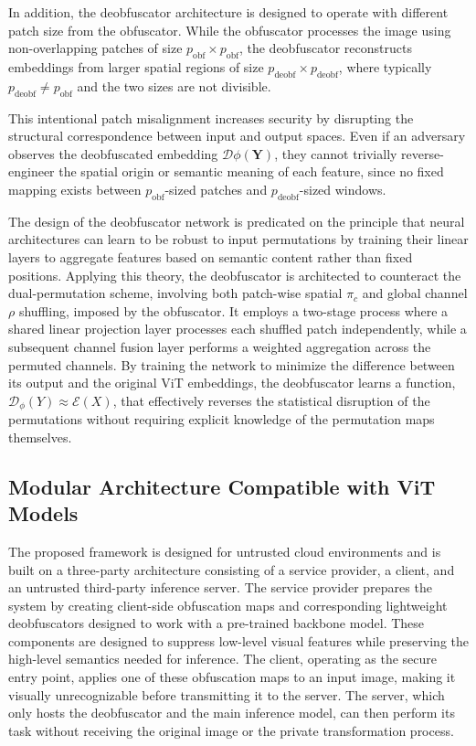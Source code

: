 \documentclass{ieeeaccess}
\newcommand{\rev}[1]{{\color{black}#1}}
\begin{document}
In addition, the deobfuscator architecture is designed to operate with different patch size from the obfuscator. While the obfuscator processes the image using non-overlapping patches of size $p_{\text{obf}} \times p_{\text{obf}}$, the deobfuscator reconstructs embeddings from larger spatial regions of size $p_{\text{deobf}} \times p_{\text{deobf}}$, where typically $p_{\text{deobf}} \neq p_{\text{obf}}$ and the two sizes are not divisible.

This intentional patch misalignment increases security by disrupting the structural correspondence between input and output spaces. Even if an adversary observes the deobfuscated embedding $\mathcal{D}\phi(\mathbf{Y})$, they cannot trivially reverse-engineer the spatial origin or semantic meaning of each feature, since no fixed mapping exists between $p_{\text{obf}}$-sized patches and $p_{\text{deobf}}$-sized windows.

{The design of the deobfuscator network is predicated on the principle that neural architectures can learn to be robust to input permutations by training their linear layers to aggregate features based on semantic content rather than fixed positions. Applying this theory, the deobfuscator is architected to counteract the dual-permutation scheme, involving both patch-wise spatial $\pi_c$ and global channel $\rho$ shuffling, imposed by the obfuscator. It employs a two-stage process where a shared linear projection layer processes each shuffled patch independently, while a subsequent channel fusion layer performs a weighted aggregation across the permuted channels. By training the network to minimize the difference between its output and the original ViT embeddings, the deobfuscator learns a function, $\mathcal{D}_{\phi}(Y) \approx \mathcal{E}(X)$, that effectively reverses the statistical disruption of the permutations without requiring explicit knowledge of the permutation maps themselves.}


\subsection{Modular Architecture Compatible with ViT Models}\label{sec:pro:modular}

\rev{The proposed framework is designed for untrusted cloud environments and is built on a three-party architecture consisting of a service provider, a client, and an untrusted third-party inference server. The service provider prepares the system by creating client-side obfuscation maps and corresponding lightweight deobfuscators designed to work with a pre-trained backbone model. These components are designed to suppress low-level visual features while preserving the high-level semantics needed for inference. The client, operating as the secure entry point, applies one of these obfuscation maps to an input image, making it visually unrecognizable before transmitting it to the server. The server, which only hosts the deobfuscator and the main inference model, can then perform its task without receiving the original image or the private transformation process.}
\end{document}
